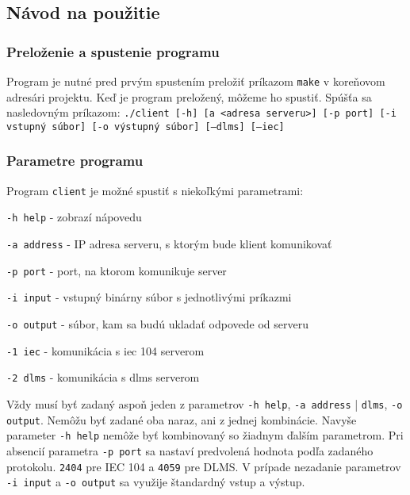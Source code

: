 \subsection{Návod na použitie}
\subsubsection{Preloženie a spustenie programu}
Program je nutné pred prvým spustením preložiť príkazom {\tt make} v koreňovom adresári projektu. Keď je program preložený, môžeme ho spustiť. Spúšťa sa nasledovným príkazom: \newline
{\tt ./client [-h] [a <adresa serveru>] [-p port] [-i vstupný súbor] [-o výstupný súbor] [--dlms] [--iec]}
\subsubsection{Parametre programu}
Program {\tt client} je možné spustiť s niekoľkými parametrami:
\begin{description}
\item {\tt -h \textendash\textendash help} - zobrazí nápovedu
\item {\tt -a \textendash\textendash address} - IP adresa serveru, s ktorým bude klient komunikovať
\item {\tt -p \textendash\textendash port} - port, na ktorom komunikuje server
\item {\tt -i \textendash\textendash input} - vstupný binárny súbor s jednotlivými príkazmi
\item {\tt -o \textendash\textendash output} - súbor, kam sa budú ukladať odpovede od serveru
\item {\tt -1 \textendash\textendash iec} - komunikácia s iec 104 serverom
\item {\tt -2 \textendash\textendash dlms} - komunikácia s dlms serverom
\end{description}
Vždy musí byť zadaný aspoň jeden z parametrov {\tt -h \textendash\textendash help}, {\tt -a \textendash\textendash address} | {\tt \textendash\textendash dlms}, {\tt -o \textendash\textendash output}. Nemôžu byť zadané oba naraz, ani z jednej kombinácie. Navyše parameter {\tt -h \textendash\textendash help} nemôže byť kombinovaný so žiadnym ďalším parametrom. Pri absencií parametra {\tt -p \textendash\textendash port} sa nastaví predvolená hodnota podľa zadaného protokolu. {\tt 2404} pre IEC 104 a {\tt 4059} pre DLMS. V prípade nezadanie parametrov {\tt -i \textendash\textendash input} a {\tt -o \textendash\textendash output} sa využije štandardný vstup a výstup.
